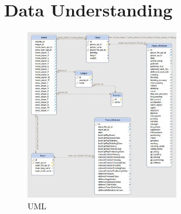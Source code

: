
\chapter{Data Understanding}

\begin{figure}[h]
\centering
\includegraphics[width=0.6\textwidth]{images/erm.png}
\caption{UML}
\label{geo1}
\end{figure}